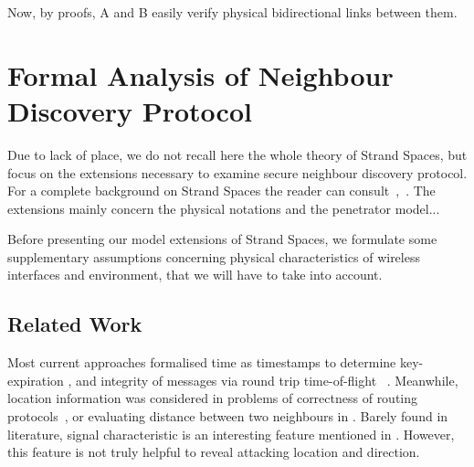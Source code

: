 \begin{flushleft}
\begin{flushleft}
Now, by proofs, A and B easily verify physical bidirectional links between them. 

\section{Formal Analysis of Neighbour Discovery Protocol}



Due to lack of place, we do not recall here the whole theory of Strand Spaces, but focus on the extensions necessary to examine secure neighbour discovery protocol. For a complete background on Strand Spaces the reader can consult~\cite{674832},~\cite{Guttman:2002:ATS:568264.568267}. The extensions mainly concern the physical notations and the penetrator model...
 
Before presenting our model extensions of Strand Spaces, we formulate some supplementary assumptions concerning physical characteristics of wireless interfaces and environment, that we will have to take into account. 

\subsection{Related Work}

Most current approaches formalised time as timestamps to determine key-expiration \cite{Li:2007:ESS:1338438.1338469} , and integrity of messages via round trip time-of-flight ~\cite{Poturalski:2008:TPS:1456396.1456400, RaphaelJamet}. Meanwhile, location information was considered in problems of correctness of routing protocols~\cite{5230621,Basin:2009:LGP:1616077.1616079}, or evaluating distance between two neighbours in \cite{Poturalski:2008:TPS:1456396.1456400}. Barely found in literature, signal characteristic is an interesting feature mentioned in \cite{Poturalski:2008:TPS:1456396.1456400}. However, this feature is not truly helpful to reveal attacking location and direction. 


\end{flushleft}
\end{flushleft}
